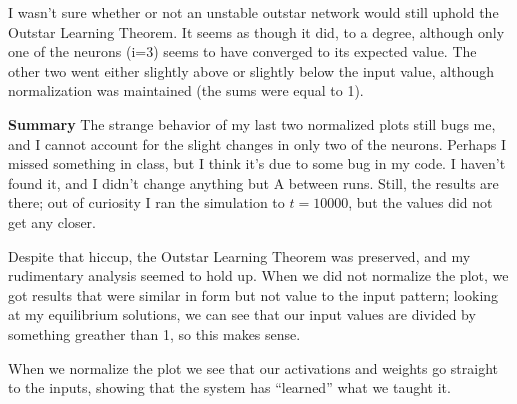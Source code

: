 \documentclass[a4paper,12pt]{article}
\begin{document}
I wasn't sure whether or not an unstable outstar network would still uphold the Outstar Learning Theorem. It seems as though it did, to a degree, although only one of the neurons (i=3) seems to have converged to its expected value. The other two went either slightly above or slightly below the input value, although normalization was maintained (the sums were equal to 1). 

\begin{center}
\begin{figure}[h!]
\end{figure}
\end{center}

\begin{center}
\begin{figure}[h!]
\end{figure}
\end{center}

\begin{center}
\begin{figure}[h!]
\end{figure}
\end{center}

\begin{center}
\begin{figure}[h!]
\end{figure}
\end{center}

\vfil\eject

{\bf Summary}
\bigskip
The strange behavior of my last two normalized plots still bugs me, and I cannot account for the slight changes in only two of the neurons. Perhaps I missed something in class, but I think it's due to some bug in my code. I haven't found it, and I didn't change anything but A between runs. Still, the results are there; out of curiosity I ran the simulation to $t=10000$, but the values did not get any closer. 

\vspace{2mm}

Despite that hiccup, the Outstar Learning Theorem was preserved, and my rudimentary analysis seemed to hold up. When we did not normalize the plot, we got results that were similar in form but not value to the input pattern; looking at my equilibrium solutions, we can see that our input values are divided by something greather than 1, so this makes sense. 

\vspace{2mm}

When we normalize the plot we see that our activations and weights go straight to the inputs, showing that the system has ``learned'' what we taught it. 
\end{document}
